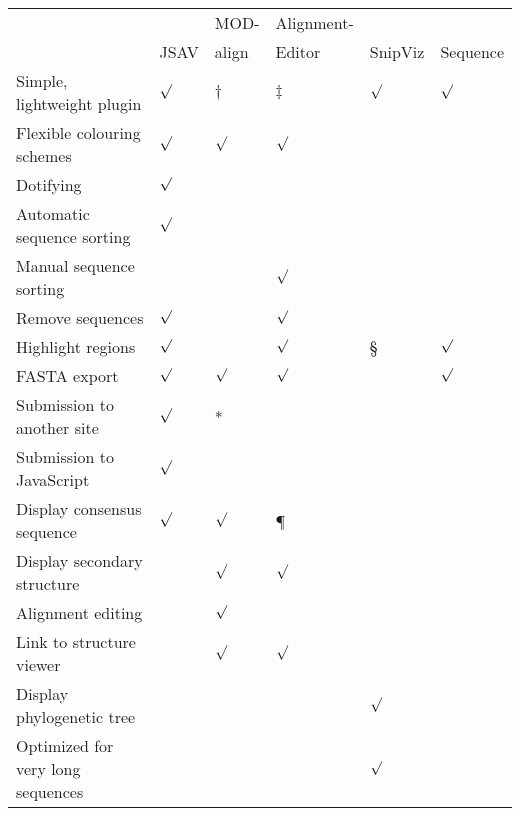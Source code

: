 \documentclass[a4]{article}
\newcommand{\tick}{\mbox{$\surd$}}
\begin{document}
\begin{table}
\footnotesize
\begin{center}
\begin{tabularx}{\linewidth}{Xlllll} \hline
                                  &       & MOD-     & Alignment-       &         &          \\
                                  & JSAV  &    align &           Editor & SnipViz & Sequence \\ \hline
Simple, lightweight plugin        & \tick & $\dag$   & $\ddag$          & \tick   & \tick    \\
Flexible colouring schemes        & \tick & \tick    & \tick            &         &          \\
Dotifying                         & \tick &          &                  &         &          \\
Automatic sequence sorting        & \tick &          &                  &         &          \\
Manual sequence sorting           &       &          & \tick            &         &          \\
Remove sequences                  & \tick &          & \tick            &         &          \\
Highlight regions                 & \tick &          & \tick            & \S      & \tick    \\
FASTA export                      & \tick & \tick    & \tick            &         & \tick    \\
Submission to another site        & \tick & *        &                  &         &          \\
Submission to JavaScript          & \tick &          &                  &         &          \\
Display consensus sequence        & \tick & \tick    & \P               &         &          \\
Display secondary structure       &       & \tick    & \tick            &         &          \\
Alignment editing                 &       & \tick    &                  &         &          \\
Link to structure viewer          &       & \tick    & \tick            &         &          \\
Display phylogenetic tree         &       &          &                  & \tick   &          \\
Optimized for very long sequences &       &          &                  & \tick   &          \\ \hline

\end{tabularx}
\end{center}
\end{table}
\end{document}
